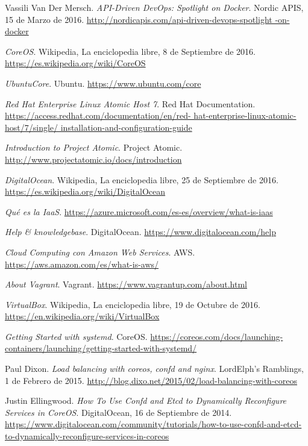 \begin{thebibliography}{9}
Vassili Van Der Mersch.
\textit{API-Driven DevOps: Spotlight on Docker}. 
Nordic APIS, 15 de Marzo de 2016.
\url{http://nordicapis.com/api-driven-devops-spotlight
-on-docker}

\textit{CoreOS}. 
Wikipedia, La enciclopedia libre, 8 de Septiembre de 2016.
\url{https://es.wikipedia.org/wiki/CoreOS}

\textit{UbuntuCore}. 
Ubuntu.
\url{https://www.ubuntu.com/core}

\textit{Red Hat Enterprise Linux Atomic Host 7}. 
Red Hat Documentation.
\url{https://access.redhat.com/documentation/en/red-
hat-enterprise-linux-atomic-host/7/single/
installation-and-configuration-guide}

\textit{Introduction to Project Atomic}. 
Project Atomic.
\url{http://www.projectatomic.io/docs/introduction}

\textit{DigitalOcean}. 
Wikipedia, La enciclopedia libre, 25 de Septiembre de 2016.
\url{https://es.wikipedia.org/wiki/DigitalOcean}

\textit{Qué es la IaaS}.
\url{https://azure.microsoft.com/es-es/overview/what-is-iaas}

\textit{Help \& knowledgebase}. 
DigitalOcean.
\url{https://www.digitalocean.com/help}

\textit{Cloud Computing con Amazon Web Services}. 
AWS.
\url{https://aws.amazon.com/es/what-is-aws/}

\textit{About Vagrant}. 
Vagrant.
\url{https://www.vagrantup.com/about.html}

\textit{VirtualBox}. 
Wikipedia, La enciclopedia libre, 19 de Octubre de 2016.
\url{https://en.wikipedia.org/wiki/VirtualBox}

\textit{Getting Started with systemd}. 
CoreOS.
\url{https://coreos.com/docs/launching-containers/launching/getting-started-with-systemd/}

Paul Dixon.
\textit{Load balancing with coreos, confd and nginx}. 
LordElph's Ramblings, 1 de Febrero de 2015.
\url{http://blog.dixo.net/2015/02/load-balancing-with-coreos}

Justin Ellingwood.
\textit{How To Use Confd and Etcd to Dynamically Reconfigure Services in CoreOS}. 
DigitalOcean, 16 de Septiembre de 2014.
\url{https://www.digitalocean.com/community/tutorials/how-to-use-confd-and-etcd-to-dynamically-reconfigure-services-in-coreos}


\end{thebibliography}
